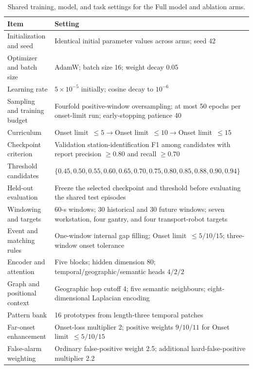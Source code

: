 \documentclass[a4paper,fleqn]{cas-dc}
\begin{document}
\begin{table}[pos=!bp]
\centering
\caption{Shared training, model, and task settings for the Full model and ablation arms.}
\label{tab:shared-training-protocol}
\footnotesize
\setlength{\tabcolsep}{6pt}
\renewcommand{\arraystretch}{1.05}
\begin{tabularx}{\textwidth}{@{}lX@{}}
\toprule
Item & Setting \\
\midrule
Initialization and seed & Identical initial parameter values across arms; seed 42 \\
Optimizer and batch size & AdamW; batch size 16; weight decay 0.05 \\
Learning rate & $5\times10^{-5}$ initially; cosine decay to $10^{-6}$ \\
Sampling and training budget & Fourfold positive-window oversampling; at most 50 epochs per onset-limit run; early-stopping patience 40 \\
Curriculum & Onset limit~$\leq5\rightarrow$Onset limit~$\leq10\rightarrow$Onset limit~$\leq15$ \\
Checkpoint criterion & Validation station-identification F1 among candidates with report precision $\geq0.80$ and recall $\geq0.70$ \\
Threshold candidates & $\{0.45,0.50,0.55,0.60,0.65,0.70,0.75,0.80,0.85,0.88,0.90,0.94\}$ \\
Held-out evaluation & Freeze the selected checkpoint and threshold before evaluating the shared test episodes \\
Windowing and targets & 60-s windows; 30 historical and 30 future windows; seven workstation, four gantry, and four transport-robot targets \\
Event and matching rules & One-window internal gap filling; Onset limit~$\leq5/10/15$; three-window onset tolerance \\
Encoder and attention & Five blocks; hidden dimension 80; temporal/geographic/semantic heads $4/2/2$ \\
Graph and positional context & Geographic hop cutoff 4; five semantic neighbours; eight-dimensional Laplacian encoding \\
Pattern bank & 16 prototypes from length-three temporal patches \\
Far-onset enhancement & Onset-loss multiplier 2; positive weights $9/10/11$ for Onset limit~$\leq5/10/15$ \\
False-alarm weighting & Ordinary false-positive weight 2.5; additional hard-false-positive multiplier 2.2 \\
\bottomrule
\end{tabularx}
\end{table}
\end{document}
